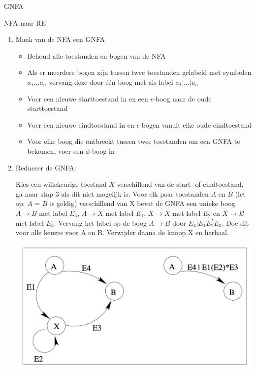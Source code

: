 \begin{theo}[GNFA]{GNFA}
\begin{minipage}{.4\textwidth}
    \end{minipage}
\end{theo}

\begin{alg}[NFA $\to$ RE]{NFA naar RE}
    \begin{enumerate}
        \item Maak van de NFA een GNFA
        \begin{itemize}
            \item Behoud alle toestanden en bogen van de NFA
            \item Als er meerdere bogen zijn tussen twee toestanden gelabeld met symbolen \(a_{1} \ldots a_{n} \) vervang deze door één boog met als label \(a_{1} | \ldots | a_{n} \)
            \item Voer een nieuwe starttoestand in en een \(\epsilon\)-boog naar de oude starttoestand
            \item Voer een nieuwe eindtoestand in en \(\epsilon\)-bogen vanuit elke oude eindtoestand
            \item Voor elke boog die ontbreekt tussen twee toestanden om een GNFA te bekomen, voer een \(\phi\)-boog in
        \end{itemize}
        \item Reduceer de GNFA: \vspace{0.3cm} \\
            \begin{minipage}{.453\textwidth} 
                Kies een willekeurige toestand \(X\) verschillend van de start- of eindtoestand, ga naar stap 3 als dit niet mogelijk is.
                Voor elk paar toestanden \(A\) en \(B\) (let op: \(A\) = \(B\) is geldig) verschillend van X bevat de GNFA een unieke boog \(A \to B\) met label \(E_{4}\), 
                \(A \to X\) met label \(E_{1}\), \(X \to X\) met label \(E_{2}\) en \(X \to B\) met label \(E_{3}\). Vervang het label op de boog \(A \to B\) door \(E_{4} | E_{1}E_{2}^{*}E_{3}\).
                Doe dit voor alle keuzes voor A en B. Verwijder daana de knoop X en herhaal.
            \end{minipage}
            \begin{minipage}{.43\textwidth}
                \hspace{0.3cm}\includegraphics[scale = 0.375]{Images/GNFAToestandVerwijderen}

\end{minipage}
\end{enumerate}
\end{alg}
